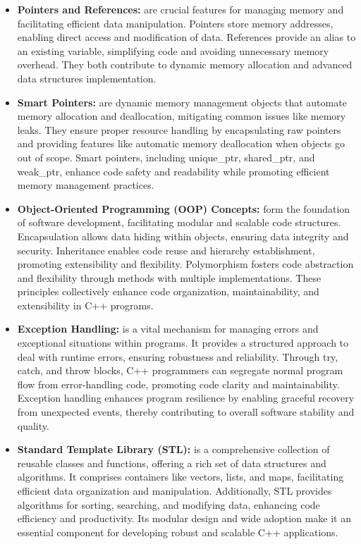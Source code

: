 \begin{itemize}
            \item \textbf{Pointers and References:} are crucial features for managing memory and facilitating efficient data manipulation. Pointers store memory addresses, enabling direct access and modification of data. References provide an alias to an existing variable, simplifying code and avoiding unnecessary memory overhead. They both contribute to dynamic memory allocation and advanced data structures implementation.
            
            \item \textbf{Smart Pointers:} are dynamic memory management objects that automate memory allocation and deallocation, mitigating common issues like memory leaks. They ensure proper resource handling by encapsulating raw pointers and providing features like automatic memory deallocation when objects go out of scope. Smart pointers, including unique\_ptr, shared\_ptr, and weak\_ptr, enhance code safety and readability while promoting efficient memory management practices.
            
            \item \textbf{Object-Oriented Programming (OOP) Concepts:} form the foundation of software development, facilitating modular and scalable code structures. Encapsulation allows data hiding within objects, ensuring data integrity and security. Inheritance enables code reuse and hierarchy establishment, promoting extensibility and flexibility. Polymorphism fosters code abstraction and flexibility through methods with multiple implementations. These principles collectively enhance code organization, maintainability, and extensibility in C++ programs.
            
            \item \textbf{Exception Handling:} is a vital mechanism for managing errors and exceptional situations within programs. It provides a structured approach to deal with runtime errors, ensuring robustness and reliability. Through try, catch, and throw blocks, C++ programmers can segregate normal program flow from error-handling code, promoting code clarity and maintainability. Exception handling enhances program resilience by enabling graceful recovery from unexpected events, thereby contributing to overall software stability and quality.
            
            \item \textbf{Standard Template Library (STL):} is a comprehensive collection of reusable classes and functions, offering a rich set of data structures and algorithms. It comprises containers like vectors, lists, and maps, facilitating efficient data organization and manipulation. Additionally, STL provides algorithms for sorting, searching, and modifying data, enhancing code efficiency and productivity. Its modular design and wide adoption make it an essential component for developing robust and scalable C++ applications.
            

\end{itemize}

